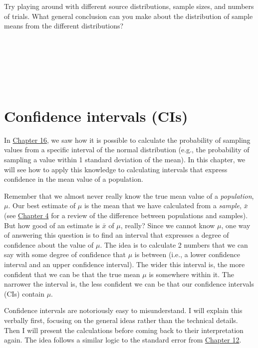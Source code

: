\documentclass[
  openany]{krantz}
\begin{document}
\begin{verbatim}






\end{verbatim}

Try playing around with different source distributions, sample sizes, and numbers of trials.
What general conclusion can you make about the distribution of sample means from the different distributions?

\begin{verbatim}






\end{verbatim}

\hypertarget{Chapter_18}{%
\chapter{Confidence intervals (CIs)}\label{Chapter_18}}

In \protect\hyperlink{Chapter_16}{Chapter 16}, we saw how it is possible to calculate the probability of sampling values from a specific interval of the normal distribution (e.g., the probability of sampling a value within 1 standard deviation of the mean).
In this chapter, we will see how to apply this knowledge to calculating intervals that express confidence in the mean value of a population.

Remember that we almost never really know the true mean value of a \emph{population}, \(\mu\).
Our best estimate of \(\mu\) is the mean that we have calculated from a \emph{sample}, \(\bar{x}\) (see \protect\hyperlink{Chapter_4}{Chapter 4} for a review of the difference between populations and samples).
But how good of an estimate is \(\bar{x}\) of \(\mu\), really?
Since we cannot know \(\mu\), one way of answering this question is to find an interval that expresses a degree of confidence about the value of \(\mu\).
The idea is to calculate 2 numbers that we can say with some degree of confidence that \(\mu\) is between (i.e., a lower confidence interval and an upper confidence interval).
The wider this interval is, the more confident that we can be that the true mean \(\mu\) is somewhere within it.
The narrower the interval is, the less confident we can be that our confidence intervals (CIs) contain \(\mu\).

Confidence intervals are notoriously easy to misunderstand.
I will explain this verbally first, focusing on the general ideas rather than the technical details.
Then I will present the calculations before coming back to their interpretation again.
The idea follows a similar logic to the standard error from \protect\hyperlink{Chapter_12}{Chapter 12}.
\end{document}
